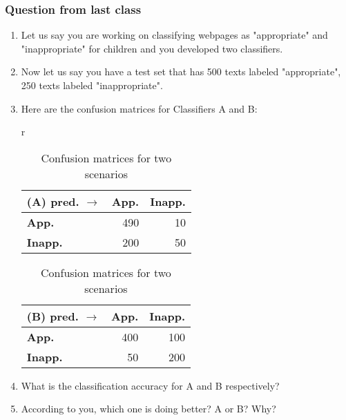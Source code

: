 \documentclass{beamer}
\begin{document}
\begin{frame}
\frametitle{Question from last class}
\begin{enumerate}
\item Let us say you are working on classifying webpages as "appropriate" and "inappropriate" for children and you developed two classifiers. 
\item Now let us say you have a test set that has 500 texts labeled "appropriate", 250 texts labeled "inappropriate".
\item Here are the confusion matrices for Classifiers A and B: \\
\begin{table}[h]
\begin{center}
\begin{tabular}{r}
  \begin{tabular}{|l|r|r|}
    \hline
    (A) pred. $\rightarrow$&\textbf{App.}&\textbf{Inapp.}\\
    \hline
    \textbf{App.}&490&10\\ \hline
    \textbf{Inapp.}&200&50\\ \hline
    \end{tabular}
  \begin{tabular}{|l|r|r|}
    \hline
    (B) pred. $\rightarrow$&\textbf{App.}&\textbf{Inapp.}\\
    \hline
    \textbf{App.}&400&100\\ \hline
    \textbf{Inapp.}&50&200\\ \hline
    \end{tabular}
\end{tabular}
\caption{Confusion matrices for two scenarios}
\end{center}
\end{table}
\item What is the classification accuracy for A and B respectively?
\item According to you, which one is doing better? A or B? Why? 
\end{enumerate}
\end{frame}
\end{document}
